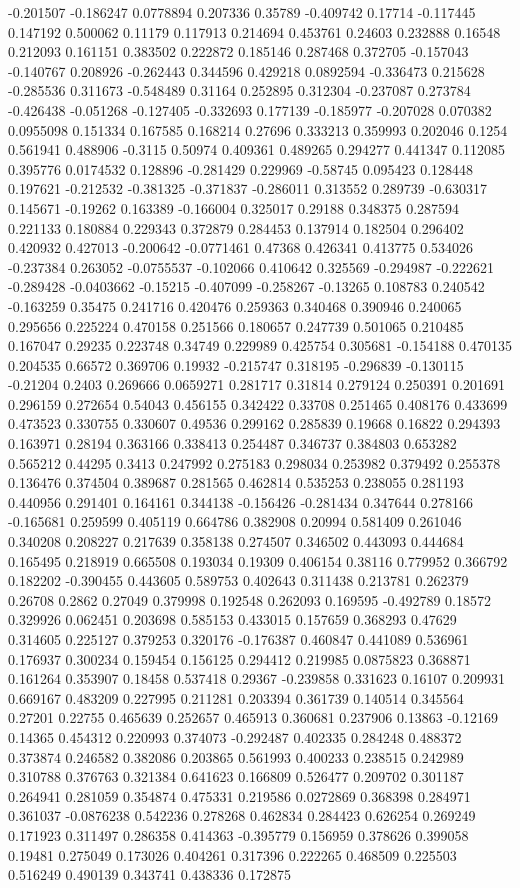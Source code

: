 -0.201507 -0.186247 0.0778894 0.207336 0.35789 -0.409742 0.17714 -0.117445 0.147192 0.500062 0.11179 0.117913 0.214694 0.453761 0.24603 0.232888 0.16548 0.212093 0.161151 0.383502 0.222872 0.185146 0.287468 0.372705 -0.157043 -0.140767 0.208926 -0.262443 0.344596 0.429218 0.0892594 -0.336473 0.215628 -0.285536 0.311673 -0.548489 0.31164 0.252895 0.312304 -0.237087 0.273784 -0.426438 -0.051268 -0.127405 -0.332693 0.177139 -0.185977 -0.207028 0.070382 0.0955098 0.151334 0.167585 0.168214 0.27696 0.333213 0.359993 0.202046 0.1254 0.561941 0.488906 -0.3115 0.50974 0.409361 0.489265 0.294277 0.441347 0.112085 0.395776 0.0174532 0.128896 -0.281429 0.229969 -0.58745 0.095423 0.128448 0.197621 -0.212532 -0.381325 -0.371837 -0.286011 0.313552 0.289739 -0.630317 0.145671 -0.19262 0.163389 -0.166004 0.325017 0.29188 0.348375 0.287594 0.221133 0.180884 0.229343 0.372879 0.284453 0.137914 0.182504 0.296402 0.420932 0.427013 -0.200642 -0.0771461 0.47368 0.426341 0.413775 0.534026 -0.237384 0.263052 -0.0755537 -0.102066 0.410642 0.325569 -0.294987 -0.222621 -0.289428 -0.0403662 -0.15215 -0.407099 -0.258267 -0.13265 0.108783 0.240542 -0.163259 0.35475 0.241716 0.420476 0.259363 0.340468 0.390946 0.240065 0.295656 0.225224 0.470158 0.251566 0.180657 0.247739 0.501065 0.210485 0.167047 0.29235 0.223748 0.34749 0.229989 0.425754 0.305681 -0.154188 0.470135 0.204535 0.66572 0.369706 0.19932 -0.215747 0.318195 -0.296839 -0.130115 -0.21204 0.2403 0.269666 0.0659271 0.281717 0.31814 0.279124 0.250391 0.201691 0.296159 0.272654 0.54043 0.456155 0.342422 0.33708 0.251465 0.408176 0.433699 0.473523 0.330755 0.330607 0.49536 0.299162 0.285839 0.19668 0.16822 0.294393 0.163971 0.28194 0.363166 0.338413 0.254487 0.346737 0.384803 0.653282 0.565212 0.44295 0.3413 0.247992 0.275183 0.298034 0.253982 0.379492 0.255378 0.136476 0.374504 0.389687 0.281565 0.462814 0.535253 0.238055 0.281193 0.440956 0.291401 0.164161 0.344138 -0.156426 -0.281434 0.347644 0.278166 -0.165681 0.259599 0.405119 0.664786 0.382908 0.20994 0.581409 0.261046 0.340208 0.208227 0.217639 0.358138 0.274507 0.346502 0.443093 0.444684 0.165495 0.218919 0.665508 0.193034 0.19309 0.406154 0.38116 0.779952 0.366792 0.182202 -0.390455 0.443605 0.589753 0.402643 0.311438 0.213781 0.262379 0.26708 0.2862 0.27049 0.379998 0.192548 0.262093 0.169595 -0.492789 0.18572 0.329926 0.062451 0.203698 0.585153 0.433015 0.157659 0.368293 0.47629 0.314605 0.225127 0.379253 0.320176 -0.176387 0.460847 0.441089 0.536961 0.176937 0.300234 0.159454 0.156125 0.294412 0.219985 0.0875823 0.368871 0.161264 0.353907 0.18458 0.537418 0.29367 -0.239858 0.331623 0.16107 0.209931 0.669167 0.483209 0.227995 0.211281 0.203394 0.361739 0.140514 0.345564 0.27201 0.22755 0.465639 0.252657 0.465913 0.360681 0.237906 0.13863 -0.12169 0.14365 0.454312 0.220993 0.374073 -0.292487 0.402335 0.284248 0.488372 0.373874 0.246582 0.382086 0.203865 0.561993 0.400233 0.238515 0.242989 0.310788 0.376763 0.321384 0.641623 0.166809 0.526477 0.209702 0.301187 0.264941 0.281059 0.354874 0.475331 0.219586 0.0272869 0.368398 0.284971 0.361037 -0.0876238 0.542236 0.278268 0.462834 0.284423 0.626254 0.269249 0.171923 0.311497 0.286358 0.414363 -0.395779 0.156959 0.378626 0.399058 0.19481 0.275049 0.173026 0.404261 0.317396 0.222265 0.468509 0.225503 0.516249 0.490139 0.343741 0.438336 0.172875 